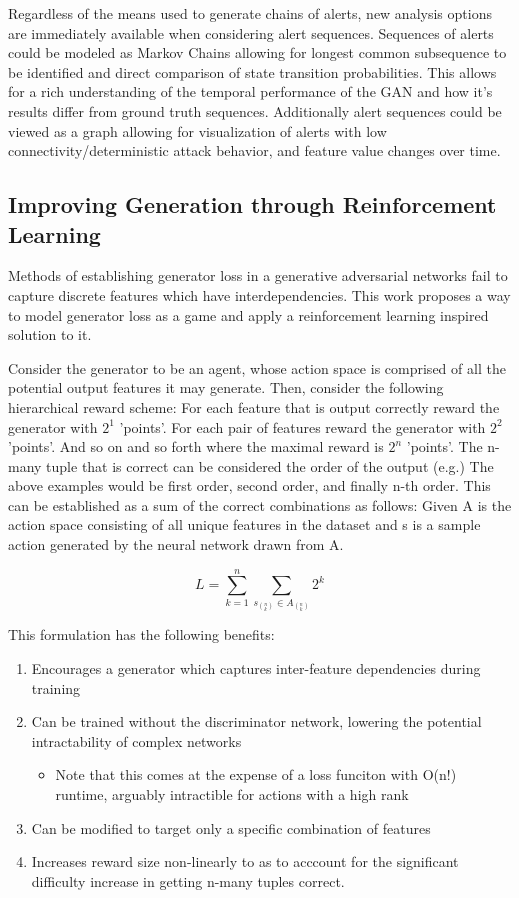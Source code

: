 Regardless of the means used to generate chains of alerts, new analysis options are immediately available when considering alert sequences. Sequences of alerts could be modeled as Markov Chains allowing for longest common subsequence to be identified and direct comparison of state transition probabilities. This allows for a rich understanding of the temporal performance of the GAN and how it's results differ from ground truth sequences. Additionally alert sequences could be viewed as a graph allowing for visualization of alerts with low connectivity/deterministic attack behavior, and feature value changes over time. 


\subsection{Improving Generation through Reinforcement Learning}

Methods of establishing generator loss in a generative adversarial networks fail to capture discrete features which have interdependencies. This work proposes a way to model generator loss as a game and apply a reinforcement learning inspired solution to it. 

Consider the generator to be an agent, whose action space is comprised of all the potential output features it may generate. Then, consider the following  hierarchical reward scheme: For each feature that is output correctly reward the generator with $2^1$ 'points'. For each pair of features reward the generator with $2^2$ 'points'. And so on and so forth where the maximal reward is $2^n$ 'points'. The n-many tuple that is correct can be considered the order of the output (e.g.) The above examples would be first order, second order, and finally n-th order. This can be established as a sum of the correct combinations as follows: Given A is the action space consisting of all unique features in the dataset	and s is a sample action generated by the neural network drawn from A.

\begin{equation}
L = \sum_{k=1}^{n}\sum_{s_{{(^n_k)}} \in A_{(^n_k)}} 2^k
\end{equation}

This formulation has the following benefits:
\begin{enumerate}
	\item Encourages a generator which captures inter-feature dependencies during training
	\item Can be trained without the discriminator network, lowering the potential intractability of complex networks
	\begin{itemize}
		\item Note that this comes at the expense of a loss funciton with O(n!) runtime, arguably intractible for actions with a high rank
	\end{itemize}
	\item Can be modified to target only a specific combination of features
	\item Increases reward size non-linearly to as to acccount for the significant difficulty increase in getting n-many tuples correct.
\end{enumerate}


